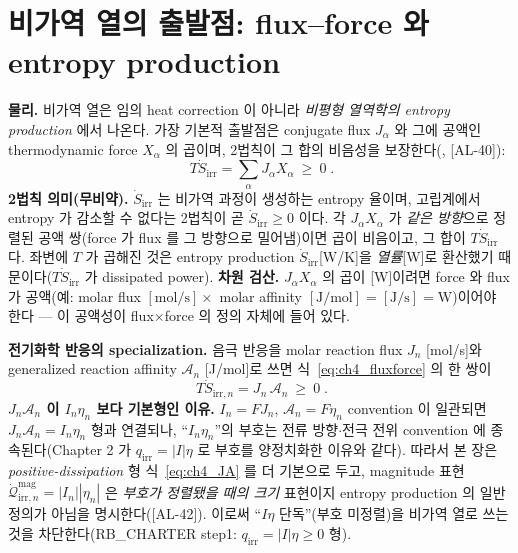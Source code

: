 \documentclass[11pt,a4paper]{article}
\newcommand{\irr}{\mathrm{irr}}
\newcommand{\AL}[1]{\textsf{[AL-#1]}}
\begin{document}
\section{비가역 열의 출발점: flux--force 와 entropy production}\label{sec:ch4_irr}
\textbf{물리.} 비가역 열은 임의 heat correction 이 아니라 \emph{비평형 열역학의 entropy production} 에서 나온다.
가장 기본적 출발점은 conjugate flux $J_\alpha$ 와 그에 공액인 thermodynamic force $X_\alpha$ 의 곱이며, 2법칙이
그 합의 비음성을 보장한다(\cite{degrootmazur1962,onsager1931,prigogine1967}, \AL{40}):
\begin{equation}
\boxed{\;T\dot S_{\irr}=\sum_\alpha J_\alpha X_\alpha\ \ge\ 0\;.}
\label{eq:ch4_fluxforce}
\end{equation}
\textbf{2법칙 의미(무비약).} $\dot S_\irr$ 는 비가역 과정이 생성하는 entropy 율이며, 고립계에서 entropy 가
감소할 수 없다는 2법칙이 곧 $\dot S_\irr\ge0$ 이다. 각 $J_\alpha X_\alpha$ 가 \emph{같은 방향}으로 정렬된
공액 쌍(force 가 flux 를 그 방향으로 밀어냄)이면 곱이 비음이고, 그 합이 $T\dot S_\irr$ 다. 좌변에 $T$ 가 곱해진
것은 entropy production $\dot S_\irr$[W/K]을 \emph{열률}[W]로 환산했기 때문이다($T\dot S_\irr$ 가 dissipated
power). \textbf{차원 검산.} $J_\alpha X_\alpha$ 의 곱이 [W]이려면 force 와 flux 가 공액(예: molar flux
$[\mathrm{mol/s}]\times$ molar affinity $[\mathrm{J/mol}]=[\mathrm{J/s}]=\mathrm W$)이어야 한다 — 이 공액성이
flux$\times$force 의 정의 자체에 들어 있다.

\textbf{전기화학 반응의 specialization.} 음극 반응을 molar reaction flux $J_n$ [mol/s]와 generalized reaction
affinity $\mathcal A_n$ [J/mol]로 쓰면 식~\eqref{eq:ch4_fluxforce} 의 한 쌍이
\begin{equation}
\boxed{\;T\dot S_{\irr,n}=J_n\,\mathcal A_n\ \ge\ 0\;.}
\label{eq:ch4_JA}
\end{equation}
\textbf{$J_n\mathcal A_n$ 이 $I_n\eta_n$ 보다 기본형인 이유.} $I_n=FJ_n$, $\mathcal A_n=F\eta_n$ convention 이
일관되면 $J_n\mathcal A_n=I_n\eta_n$ 형과 연결되나, ``$I_n\eta_n$''의 부호는 전류 방향$\cdot$전극 전위
convention 에 종속된다(Chapter 2 가 $q_\irr=|I|\eta$ 로 부호를 양정치화한 이유와 같다). 따라서 본 장은
\emph{positive-dissipation} 형 식~\eqref{eq:ch4_JA} 를 더 기본으로 두고, magnitude 표현
$\dot{\mathcal Q}_{\irr,n}^{\mathrm{mag}}=|I_n||\eta_n|$ 은 \emph{부호가 정렬됐을 때의 크기} 표현이지 entropy
production 의 일반 정의가 아님을 명시한다(\AL{42}). 이로써 ``$I\eta$ 단독''(부호 미정렬)을 비가역 열로 쓰는
것을 차단한다(RB\_CHARTER step1: $q_\irr=|I|\eta\ge0$ 형).
\end{document}
